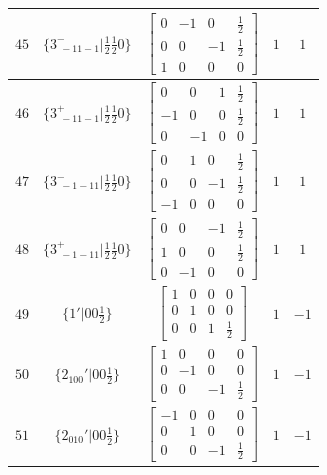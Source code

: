 \documentclass[fleqn,8pt]{jsarticle}
\begin{document}
\begin{longtable}{ccccc}
$ 45 $ & $ \{3^{-}_{\,\,-11-1}|\frac{1}{2} \frac{1}{2} 0\} $ & $ \begin{bmatrix} 0 & -1 & 0 & \frac{1}{2} \\ 0 & 0 & -1 & \frac{1}{2} \\ 1 & 0 & 0 & 0 \end{bmatrix} $ & $ 1 $ & $ 1 $ \\ \hline
$ 46 $ & $ \{3^{+}_{\,\,-11-1}|\frac{1}{2} \frac{1}{2} 0\} $ & $ \begin{bmatrix} 0 & 0 & 1 & \frac{1}{2} \\ -1 & 0 & 0 & \frac{1}{2} \\ 0 & -1 & 0 & 0 \end{bmatrix} $ & $ 1 $ & $ 1 $ \\ \hline
$ 47 $ & $ \{3^{-}_{\,\,-1-11}|\frac{1}{2} \frac{1}{2} 0\} $ & $ \begin{bmatrix} 0 & 1 & 0 & \frac{1}{2} \\ 0 & 0 & -1 & \frac{1}{2} \\ -1 & 0 & 0 & 0 \end{bmatrix} $ & $ 1 $ & $ 1 $ \\ \hline
$ 48 $ & $ \{3^{+}_{\,\,-1-11}|\frac{1}{2} \frac{1}{2} 0\} $ & $ \begin{bmatrix} 0 & 0 & -1 & \frac{1}{2} \\ 1 & 0 & 0 & \frac{1}{2} \\ 0 & -1 & 0 & 0 \end{bmatrix} $ & $ 1 $ & $ 1 $ \\ \hline
$ 49 $ & $ \{1{}'|0 0 \frac{1}{2}\} $ & $ \begin{bmatrix} 1 & 0 & 0 & 0 \\ 0 & 1 & 0 & 0 \\ 0 & 0 & 1 & \frac{1}{2} \end{bmatrix} $ & $ 1 $ & $ -1 $ \\ \hline
$ 50 $ & $ \{2{}_{100}{}'|0 0 \frac{1}{2}\} $ & $ \begin{bmatrix} 1 & 0 & 0 & 0 \\ 0 & -1 & 0 & 0 \\ 0 & 0 & -1 & \frac{1}{2} \end{bmatrix} $ & $ 1 $ & $ -1 $ \\ \hline
$ 51 $ & $ \{2{}_{010}{}'|0 0 \frac{1}{2}\} $ & $ \begin{bmatrix} -1 & 0 & 0 & 0 \\ 0 & 1 & 0 & 0 \\ 0 & 0 & -1 & \frac{1}{2} \end{bmatrix} $ & $ 1 $ & $ -1 $ \\ \hline

\end{longtable}
\end{document}
